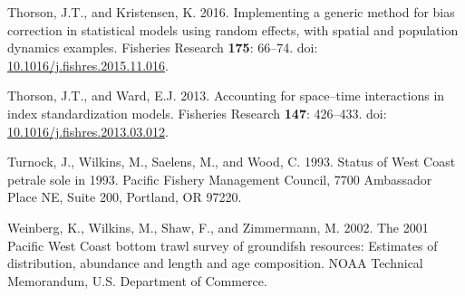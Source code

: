 \documentclass[12pt,]{article}
\begin{document}
\hypertarget{ref-thorson_implementing_2016}{}
Thorson, J.T., and Kristensen, K. 2016. Implementing a generic method
for bias correction in statistical models using random effects, with
spatial and population dynamics examples. Fisheries Research
\textbf{175}: 66--74. doi:
\href{https://doi.org/10.1016/j.fishres.2015.11.016}{10.1016/j.fishres.2015.11.016}.

\hypertarget{ref-thorson_accounting_2013}{}
Thorson, J.T., and Ward, E.J. 2013. Accounting for space--time
interactions in index standardization models. Fisheries Research
\textbf{147}: 426--433. doi:
\href{https://doi.org/10.1016/j.fishres.2013.03.012}{10.1016/j.fishres.2013.03.012}.

\hypertarget{ref-turnock_status_1993}{}
Turnock, J., Wilkins, M., Saelens, M., and Wood, C. 1993. Status of West
Coast petrale sole in 1993. Pacific Fishery Management Council, 7700
Ambassador Place NE, Suite 200, Portland, OR 97220.

\hypertarget{ref-weinberg_2001_2002}{}
Weinberg, K., Wilkins, M., Shaw, F., and Zimmermann, M. 2002. The 2001
Pacific West Coast bottom trawl survey of groundifsh resources:
Estimates of distribution, abundance and length and age composition.
NOAA Technical Memorandum, U.S. Department of Commerce.
\end{document}
